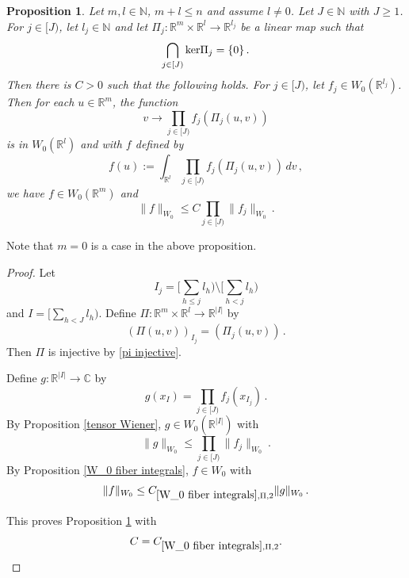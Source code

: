\documentclass[12pt,reqno]{amsart}
\theoremstyle{plain}
\newtheorem{proposition}[theorem]{Proposition}
\numberwithin{equation}{section}
\theoremstyle{remark}
\newcommand{\using}[1]{}
\newcommand{\R}{{\mathbb R}}
\newcommand{\N}{{\mathbb N}}
\newcommand{\C}{{\mathbb C}}
\begin{document}
\begin{proposition}\label{W_0 Brascamp Lieb}\using{tensor Wiener}\using{W_0 fiber integrals}
 Let  $m,l\in\N$, $m+l\le n$ and assume $l\neq 0$.
Let $J\in \N$ with $J\ge 1$. For $j\in [J)$, let $l_j\in \N$ and let  $\Pi_j:\R^m\times \R^l \to \R^{l_j}$
be a linear map such that
\begin{equation}\label{pi injective}
    \bigcap_{j\in [J)} {\rm ker}\Pi_j=\{0\}\, .
\end{equation}
Then there is $C>0$ such that the following holds.
For $j\in [J)$, let $f_j\in W_0(\R^{l_j})$. Then for each
 $u\in \R^m$, the function
 \begin{equation}\label{auto:Wiener-Brascamp-Lieb-fiber-integrand}
     v\to \prod_{j\in [J)}f_j(\Pi_{j}(u,v))
 \end{equation}
 is in $W_0(\R^l)$ and with $f$ defined by
    \begin{equation}\label{auto:Wiener-Brascamp-Lieb-integral}
        f(u):=\int_{\R^l}\prod_{j\in [J)}f_j(\Pi_{j}(u,v))\, dv \, ,
    \end{equation}
    we have $f\in W_0(\R^{m})$ and
    \begin{equation}\label{auto:Wiener-Brascamp-Lieb-bound}
        \|f\|_{W_0}\le C\prod_{j\in[J)}\|f_j\|_{W_0}\, .
    \end{equation}
\end{proposition}
Note that $m=0$ is a case in the above proposition.
\begin{proof}
Let
\begin{equation}
    I_j=[\sum_{h\le j}l_h)\setminus [\sum_{h<j}l_h)
\end{equation}
and $I=[\sum_{h<J} l_h)$.
Define
$\Pi:\R^{m}\times \R^l\to \R^{|I|}$ by
\begin{equation}
    (\Pi(u,v))_{I_j}=(\Pi_{j}(u,v))\, .
\end{equation}
Then $\Pi$ is injective by \eqref{pi injective}.

Define $g:\R^{|I|}\to \C$ by
\begin{equation}
    g(x_I)=\prod_{j\in [J)}f_j(x_{I_j})\, .
\end{equation}
By Proposition \ref{tensor Wiener}, $g\in W_0(\R^{|I|})$ with
\begin{equation}
    \|g\|_{W_0}\le \prod_{j\in[J)}\|f_j\|_{W_0}\ .
\end{equation}
By Proposition \ref{W_0 fiber integrals}, $f\in W_0$ with
\begin{equation}
    \|f\|_{W_0}\le C_{\ref{W_0 fiber integrals},\Pi,2}\|g\|_{W_0}\, .
\end{equation}

This proves Proposition \ref{W_0 Brascamp Lieb} with
\[
C=C_{\ref{W_0 fiber integrals},\Pi,2}.
\]
\end{proof}
\end{document}
